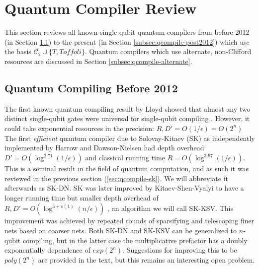 \section{Quantum Compiler Review}
\label{sec:qcompile-review}

This section reviews all known single-qubit quantum compilers from
before 2012 (in Section \ref{subsec:qcompile-pre2012}) to the
present (in Section \ref{subsec:qcompile-post2012}) which use
the basis $\mathcal{C}_2 \cup \{T, Toffoli \}$.
Quantum compilers which use alternate, non-Clifford resources
are discussed in Section \ref{subsec:qcompile-alternate}.

\subsection{Quantum Compiling Before 2012}
\label{subsec:qcompile-pre2012}

The first known quantum compiling result by Lloyd showed that almost any two
distinct single-qubit gates were universal for single-qubit compiling
\cite{Lloyd1995}. However, it could take exponential resources in the precision:
$R,D' = O(1/\epsilon) = O(2^n)$
The first \emph{efficient} quantum compiler due to
Solovay-Kitaev (SK) as independently implemented by Harrow \cite{Harrow2001}
and Dawson-Nielsen \cite{Dawson2005} had depth overhead
$D' = O(\log^{2.71}(1/\epsilon))$ and classical running time
$R = O(\log^{3.97}(1/\epsilon))$. This is a seminal result in
the field of quantum computation, and as such it was reviewed in the previous
section (\ref{sec:qcompile-sk}). We will abbreviate it afterwards as SK-DN.
SK was later improved by Kitaev-Shen-Vyalyi
to have a longer running time but smaller depth overhead of $R,D' = O(\log^{3+o(1)}(n/\epsilon))$
\cite{Kitaev2002}, an algorithm we will call SK-KSV.
This improvement was achieved by repeated rounds of sparsifying and
telescoping finer nets based on coarser nets. Both SK-DN and SK-KSV can be
generalized to $n$-qubit compiling, but in the latter case the multiplicative
prefactor has a doubly exponentially dependence of $exp(2^n)$. Suggestions
for improving this to be $poly(2^n)$ are provided in the text, but this remains
an interesting open problem.

